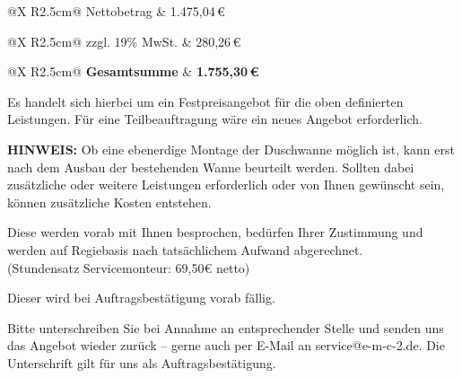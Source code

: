 \documentclass[a4paper,11pt]{article}
\begin{document}
\newpage

\noindent
\colorbox{rowgray}{%
    \parbox{\dimexpr\textwidth-2\fboxsep}{%
        \begin{tabularx}{\dimexpr{}\fboxsep}{@{}X R{2.5cm}@{}}
            Nettobetrag & 1.475,04\,\euro
        \end{tabularx}%
    }%
}

\noindent
\hspace{\fboxsep}%
\parbox{\dimexpr\textwidth-2\fboxsep}{%
    \begin{tabularx}{\dimexpr{}\fboxsep}{@{}X R{2.5cm}@{}}
        zzgl. 19\% MwSt. & 280,26\,\euro
    \end{tabularx}%
}

\noindent
\colorbox{rowgray}{%
    \parbox{\dimexpr\textwidth-2\fboxsep}{%
        \begin{tabularx}{\dimexpr{}\fboxsep}{@{}X R{2.5cm}@{}}
            \textbf{Gesamtsumme} & \textbf{1.755,30\,\euro}
        \end{tabularx}%
    }%
}

\vspace{1cm}

Es handelt sich hierbei um ein Festpreisangebot für die oben definierten Leistungen. Für eine Teilbeauftragung wäre ein neues Angebot erforderlich.

\vspace{0.6cm}

\textbf{HINWEIS:} Ob eine ebenerdige Montage der Duschwanne möglich ist, kann erst nach dem Ausbau der bestehenden Wanne beurteilt werden. Sollten dabei zusätzliche oder weitere Leistungen erforderlich oder von Ihnen gewünscht sein, können zusätzliche Kosten entstehen.

\vspace{0.5cm}

Diese werden vorab mit Ihnen besprochen, bedürfen Ihrer Zustimmung und werden auf Regiebasis nach tatsächlichem Aufwand abgerechnet.\\
(Stundensatz Servicemonteur: 69,50\euro{} netto)

\vspace{0.5cm}

Dieser wird bei Auftragsbestätigung vorab fällig.

\vspace{0.5cm}

Bitte unterschreiben Sie bei Annahme an entsprechender Stelle und senden uns das Angebot wieder zurück -- gerne auch per E-Mail an service@e-m-c-2.de. Die Unterschrift gilt für uns als Auftragsbestätigung.
\end{document}
